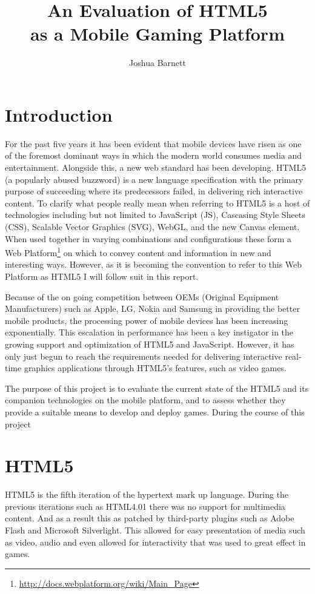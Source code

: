 \documentclass[final]{cmpreport}
\title{An Evaluation of HTML5\\as a Mobile Gaming Platform}
\author{Joshua Barnett}
\begin{document}
\section{Introduction}
For the past five years it has been evident that mobile devices have risen as one of the foremost dominant ways in which the modern world consumes media and entertainment. Alongside this, a new web standard has been developing. HTML5 (a popularly abused buzzword) is a new language specification with the primary purpose of succeeding where its predecessors failed, in delivering rich interactive content. To clarify what people really mean when referring to HTML5 is a host of technologies including but not limited to JavaScript (JS), Cascasing Style Sheets (CSS), Scalable Vector Graphics (SVG), WebGL, and the new Canvas element. When used together in varying combinations and configurations these form a Web Platform\footnote{\url{http://docs.webplatform.org/wiki/Main_Page}} on which to convey content and information in new and interesting ways. However, as it is becoming the convention to refer to this Web Platform as HTML5 I will follow suit in this report.

Because of the on going competition between OEMs (Original Equipment Manufacturers) such as Apple, LG, Nokia and Samsung in providing the better mobile products, the processing power of mobile devices has been increasing exponentially. This escalation in performance has been a key instigator in the growing support and optimization of HTML5 and JavaScript. However, it has only just begun to reach the requirements needed for delivering interactive real-time graphics applications through HTML5's features, such as video games.

The purpose of this project is to evaluate the current state of the HTML5 and its companion technologies on the mobile platform, and to assess whether they provide a suitable means to develop and deploy games. During the course of this project

\section{HTML5}
HTML5 is the fifth iteration of the hypertext mark up language. During the previous iterations such as HTML4.01 there was no support for multimedia content. And as a result this as patched by third-party plugins such as Adobe Flash and Microsoft Silverlight. This allowed for easy presentation of media such as video, audio and even allowed for interactivity that was used to great effect in games.
\end{document}
